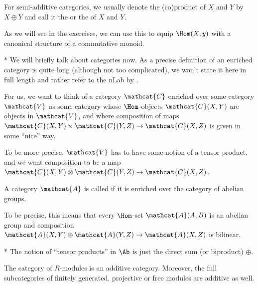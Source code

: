 \begin{remark}
  For semi-additive categories, we usually denote the (co)product of
  $X$ and  $Y$ by  $X \oplus Y$ and call it the 
  or the  of $X$ and  $Y$. 

  As we will see in the exercises, we can use this to equip $\Hom(X,y)$
  with a canonical structure of a commutative monoid.
\end{remark}

\begin{remark}*
  We will briefly talk about  categories now.
  As a precise definition of an enriched category is quite long
  (although not too complicated),
  we won't state it here in full length and rather refer to the
  nLab by
  \cite{nlab:enriched+category}.

  For us, we want to think of a category $\mathcat{C}$ enriched
  over some category $\mathcat{V}$ as some category whose
  $\Hom$-objects  $\mathcat{C}(X,Y)$ are objects in $\mathcat{V}$,
  and where composition of maps
  $\mathcat{C}(X,Y) \times \mathcat{C}(Y,Z) \to \mathcat{C}(X,Z)$
  is given in some \enquote{nice} way.
  
  To be more precise, $\mathcat{V}$ has to have some notion of
  a tensor product, and we want composition to be a map
  $\mathcat{C}(X,Y) \otimes \mathcat{C}(Y,Z) \to \mathcat{C}(X,Z)$.
\end{remark}

\begin{definition}
  A category $\mathcat{A}$ is called  if it is enriched
  over the category of abelian groups.

  To be precise, this means that every $\Hom$-set $\mathcat{A}(A,B)$ 
  is an abelian group and composition
  $\mathcat{A}(X,Y) \oplus \mathcat{A}(Y,Z) \to \mathcat{A}(X,Z)$
  is bilinear.
\end{definition}

\begin{remark}*
  The notion of \enquote{tensor products} in  $\Ab$
  is just the direct sum (or biproduct) $\oplus$.
\end{remark}

\begin{example}
  The category of $R$-modules is an additive category.
  Moreover, the full subcategories of finitely generated,
  projective or free modules are additive as well.
\end{example}
